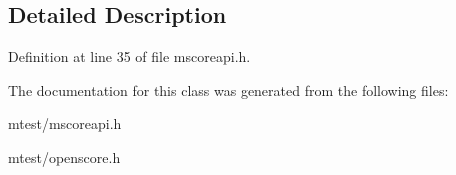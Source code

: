 \subsection{Detailed Description}


Definition at line 35 of file mscoreapi.\+h.



The documentation for this class was generated from the following files\+:\begin{DoxyCompactItemize}
\item 
mtest/mscoreapi.\+h\item 
mtest/openscore.\+h\end{DoxyCompactItemize}
